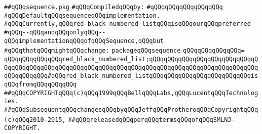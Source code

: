 \label{src/lib/src/sequence.pkg}
\verb|##qQQqsequence.pkg|\newline
\newline
\verb|#qQQqCompiledqQQqby:|\newline
\verb|#qQQqqQQqqQQqqQQqqQQq|\newline
\newline
\verb|#qQQqDefaultqQQqsequenceqQQqimplementation.|\newline
\verb|#qQQqCurrently,qQQqred_black_numbered_listqQQqisqQQqourqQQqpreferred|\newline
\verb|#qQQq--qQQqandqQQqonlyqQQq--qQQqimplementationqQQqofqQQqSequence,qQQqbut|\newline
\verb|#qQQqthatqQQqmightqQQqchange:|\newline
\newline
\verb|packageqQQqsequence|\newline
\verb|qQQqqQQqqQQqqQQq=|\newline
\verb|qQQqqQQqqQQqqQQqred_black_numbered_list;qQQqqQQqqQQqqQQqqQQqqQQqqQQqqQQqqQQqqQQqqQQqqQQqqQQqqQQqqQQqqQQqqQQqqQQqqQQqqQQqqQQqqQQqqQQqqQQqqQQqqQQqqQQqqQQq#qQQqred_black_numbered_listqQQqqQQqqQQqqQQqqQQqqQQqqQQqisqQQqfromqQQqqQQqqQQq|\newline
\newline
\newline
\verb|##qQQqCOPYRIGHTqQQq(c)qQQq1999qQQqBellqQQqLabs,qQQqLucentqQQqTechnologies.|\newline
\verb|##qQQqSubsequentqQQqchangesqQQqbyqQQqJeffqQQqProtheroqQQqCopyrightqQQq(c)qQQq2010-2015,|\newline
\verb|##qQQqreleasedqQQqperqQQqtermsqQQqofqQQqSMLNJ-COPYRIGHT.|\newline

